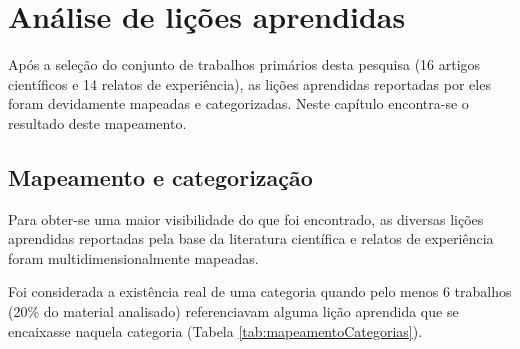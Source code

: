\chapter{Análise de lições aprendidas}

Após a seleção do conjunto de trabalhos primários desta pesquisa (16 artigos científicos e 14 relatos de experiência), as lições aprendidas reportadas por eles foram devidamente mapeadas e categorizadas. Neste capítulo encontra-se o resultado deste mapeamento.

\section{Mapeamento e categorização}
Para obter-se uma maior visibilidade do que foi encontrado, as diversas lições aprendidas reportadas pela base da literatura científica e relatos de experiência foram multidimensionalmente mapeadas.

Foi considerada a existência real de uma categoria quando pelo menos 6 trabalhos (20\% do material analisado) referenciavam alguma lição aprendida que se encaixasse naquela categoria (Tabela \ref{tab:mapeamentoCategorias}).

